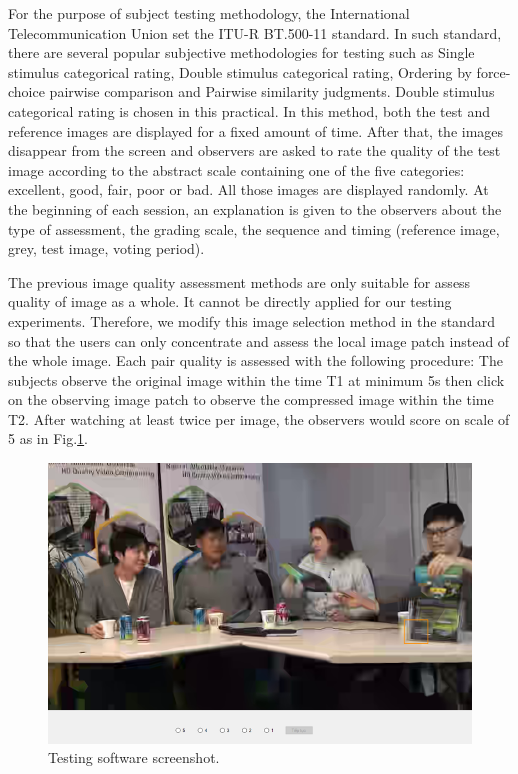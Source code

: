 For the purpose of subject testing methodology, the International Telecommunication Union set the ITU-R BT.500-11 \cite{Bt2002} standard. In such standard, there are several popular subjective methodologies for testing such as Single stimulus categorical rating, Double stimulus categorical rating, Ordering by force-choice pairwise comparison and Pairwise similarity judgments. Double stimulus categorical rating is chosen in this practical. In this method, both the test and reference images are displayed for a fixed amount of time. After that, the images disappear from the screen and observers are asked to rate the quality of the test image according to the abstract scale containing one of the five categories: excellent, good, fair, poor or bad. All those images are displayed randomly. At the beginning of each session, an explanation is given to the observers about the type of assessment, the grading scale, the sequence and timing (reference image, grey, test image, voting period).

The previous image quality assessment methods are only suitable for assess quality of image as a whole. It cannot be directly applied for our testing experiments. Therefore, we modify this image selection method in the standard so that the users can only concentrate and assess the local image patch instead of the whole image. Each pair quality is assessed with the following procedure: The subjects observe the original image within the time T1 at minimum 5s then click on the observing image patch to observe the compressed image within the time T2. After watching at least twice per image, the observers would score on scale of 5 as in Fig.\ref{fig:testing-software}.

\begin{figure}[H]
  \includegraphics[width=\linewidth]{figures/softtest.png}
  \caption{Testing software screenshot.}
  \label{fig:testing-software}
\end{figure}

